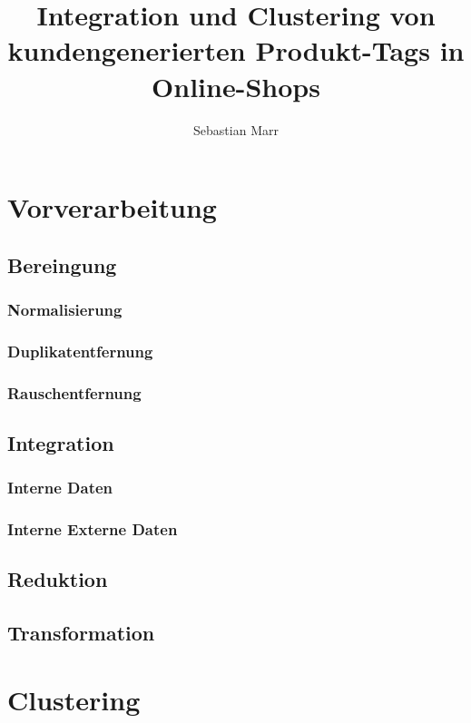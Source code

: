 \documentclass[a4paper, abstracton, DIV=calc]{scrreprt}
\author{Sebastian Marr}
\title{Integration und Clustering von kundengenerierten Produkt-Tags in Online-Shops}
\begin{document}
\maketitle

\renewcommand\abstractname{Zusammenfassung}


\tableofcontents



\chapter{Vorverarbeitung}

\section{Bereingung}
\subsection{Normalisierung}
\subsection{Duplikatentfernung}
\subsection{Rauschentfernung}

\section{Integration}
\subsection{Interne Daten}
\subsection{Interne Externe Daten}

\section{Reduktion}

\section{Transformation}

\chapter{Clustering}
\end{document}
